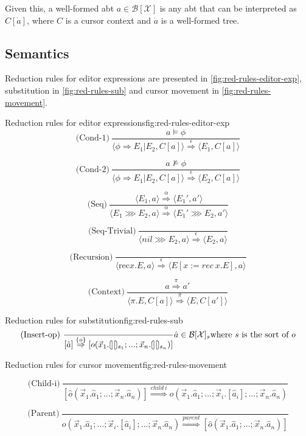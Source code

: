 Given this, a well-formed abt $a \in \mathcal{B[\mathcal{X}]}$ is any abt that 
can be interpreted as $C[\dot{a}]$, where $C$ is a cursor context and $\dot{a}$ is a well-formed tree.

\subsection{Semantics}
Reduction rules for editor expressions are presented in \cref{fig:red-rules-editor-exp}, substitution in \cref{fig:red-rules-sub} and cursor movement in \cref{fig:red-rules-movement}.



\begin{myfigure}{Reduction rules for editor expressions}{fig:red-rules-editor-exp}
    \[
        \text{(Cond-1)} \ \frac{a \models \phi}{\langle \phi \Rightarrow E_1|E_2, C[a] \rangle \stackrel{\epsilon}{\Rightarrow} \langle E_1, C[a] \rangle}
    \]

    \[
        \text{(Cond-2)} \ \frac{a \not\models \phi}{\langle \phi \Rightarrow E_1|E_2, C[a] \rangle \stackrel{\epsilon}{\Rightarrow} \langle E_2, C[a] \rangle}
    \]

    \[
        \text{(Seq)} \ \frac{\langle E_1,a \rangle \stackrel{\alpha}{\Rightarrow} \langle E_1',a' \rangle}{\langle E_1 \ggg E_2,a \rangle \stackrel{\alpha}{\Rightarrow} \langle E_1' \ggg E_2,a' \rangle}
    \]

    \[
        \text{(Seq-Trivial)} \ \frac{}{\langle nil \ggg E_2,a \rangle \stackrel{\epsilon}{\Rightarrow} \langle E_2, a \rangle}
    \]

    \[
        \text{(Recursion)} \ \frac{}{\langle \text{rec} x.E,a \rangle \stackrel{\epsilon}{\Rightarrow} \langle E[x:= rec \ x.E],a \rangle}
    \]

    \[
        \text{(Context)} \ \frac{a \stackrel{\pi}{\Rightarrow} a'}{\langle \pi.E,C[a] \rangle \stackrel{\pi}{\Rightarrow} \langle E,C[a'] \rangle}
    \]
\end{myfigure}

\begin{myfigure}{Reduction rules for substitution}{fig:red-rules-sub}
    \[
        \text{(Insert-op)} \ \frac{}{[\hat{a}] \stackrel{\{ o \}}{\Rightarrow} [o(\vec{x}_1.\hole_{s_1};...;\vec{x}_n.\hole_{s_n})]} \hat{a} \in \mathcal{B}[\mathcal{X}]_s \text{where } s \text{ is the sort of } o
    \]
\end{myfigure}
\begin{myfigure}{Reduction rules for cursor movement}{fig:red-rules-movement}

    \[
        \text{(Child-i)} \ \frac{}{[\hat{o}(\vec{x}_1.\hat{a}_1;...;\vec{x}_n.\hat{a}_n)] \stackrel{child \ i}{\Rightarrow} o(\vec{x}_1.\hat{a}_1;...;\vec{x}_i.[\hat{a}_i];...;\vec{x}_n.\hat{a}_n)}
    \]

    \[
        \text{(Parent)} \ \frac{}{o(\vec{x}_1.\hat{a}_1;...;\vec{x}_i.[\hat{a}_i];...;\vec{x}_n.\hat{a}_n) \stackrel{parent}{\Rightarrow} [\hat{o}(\vec{x}_1.\hat{a}_1;...;\vec{x}_n.\hat{a}_n)]}
    \]
\end{myfigure}


